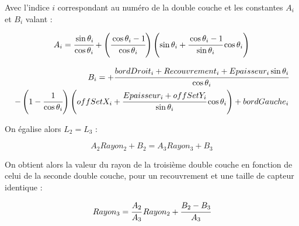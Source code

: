   Avec l'indice $i$ correspondant au num\'ero de la double couche et les constantes $A_i$ et $B_i$ valant :
  
  \begin{equation}
   A_i = \cfrac{\sin{\theta_i}}{\cos{\theta_i}}  + \left( \cfrac{\cos{\theta_i} - 1}{\cos{\theta_i}} \right) \left( \sin{\theta_i} + \cfrac{\cos{\theta_i} - 1}{\sin{\theta_i}} \cos{\theta_i} \right)
  \end{equation}

  \begin{align}
   B_i = + \cfrac{bordDroit_i + Recouvrement_i + Epaisseur_i \sin{\theta_i}}{\cos{\theta_i}} \\ \nonumber
   - \left( 1 - \cfrac{1}{\cos{\theta_i}} \right) \left( offSetX_i + \cfrac{Epaisseur_i + offSetY_i}{\sin{\theta_i}} \cos{\theta_i} \right) + bordGauche_i
  \end{align}
  
  On \'egalise alors $L_2 = L_3$ :

  \begin{equation}
   A_2 Rayon_2 + B_2 = A_3 Rayon_3 + B_3
  \end{equation}

  On obtient alors la valeur du rayon de la troisi\`eme double couche en fonction de celui de la seconde double couche, pour un recouvrement et une taille de capteur identique :
  
  \begin{equation}
   Rayon_3 = \cfrac{A_2}{A_3} \, Rayon_2 + \cfrac{B_2 - B_3}{A_3}
   \label{eq:R3_R2}
  \end{equation}

